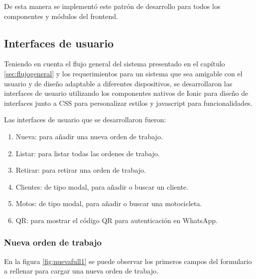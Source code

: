 De esta manera se implementó este patrón de desarrollo para todos los componentes y módulos del frontend.

\subsection{Interfaces de usuario}
\label{subsec:frontinterfaces}

Teniendo en cuenta el flujo general del sistema presentado en el capítulo \ref{sec:flujogeneral} y los requerimientos para un sistema que sea amigable con el usuario y de diseño adaptable a diferentes dispositivos, se desarrollaron las interfaces de usuario utilizando los componentes nativos de Ionic para diseño de interfaces junto a CSS para personalizar estilos y javascript para funcionalidades. 

Las interfaces de usuario que se desarrollaron fueron:

\begin{enumerate}
\item Nueva: para añadir una nueva orden de trabajo.
\item Listar: para listar todas las ordenes de trabajo.
\item Retirar: para retirar una orden de trabajo.
\item Clientes: de tipo modal, para añadir o buscar un cliente.
\item Motos: de tipo modal, para añadir o buscar una motocicleta.
\item QR: para mostrar el código QR para autenticación en WhatsApp.
\end{enumerate}

\subsubsection{Nueva orden de trabajo}
\label{subsubsec:frontnuevaorden}
En la figura \ref{fig:nuevafull1} se puede observar los primeros campos del formulario a rellenar para cargar una nueva orden de trabajo.

